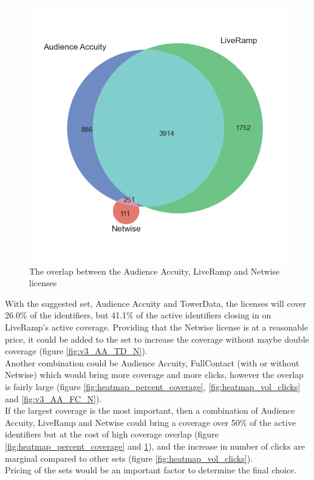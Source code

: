 \documentclass[11pt]{article} %
\begin{document}
\begin{figure}[h!]
  \includegraphics[width=0.48\linewidth]{../outputs/venn3_Audience Accuity_LiveRamp_Netwise.png}
  \caption{The overlap between the Audience Accuity, LiveRamp and Netwise licenses}
  \label{fig:v3_AA_LR_N}
\end{figure}

With the suggested set, Audience Accuity and TowerData, the licenses will cover 26.0\% of the identifiers, but 41.1\% of the active identifiers closing in on LiveRamp's active coverage. Providing that the Netwise license is at a reasonable price, it could be added to the set to increase the coverage without maybe double coverage (figure \ref{fig:v3_AA_TD_N}).\\

Another combination could be Audience Accuity, FullContact (with or without Netwise) which would bring more coverage and more clicks, however the overlap is fairly large (figure \ref{fig:heatmap_percent_coverage}, \ref{fig:heatmap_vol_clicks} and \ref{fig:v3_AA_FC_N}).\\

If the largest coverage is the most important, then a combination of Audience Accuity, LiveRamp and Netwise could bring a coverage over 50\% of the active identifiers but at the cost of high coverage overlap (figure \ref{fig:heatmap_percent_coverage}  and \ref{fig:v3_AA_LR_N}), and the increase in number of clicks are marginal compared to other sets (figure \ref{fig:heatmap_vol_clicks}).\\

Pricing of the sets would be an important factor to determine the final choice. 
\end{document}
